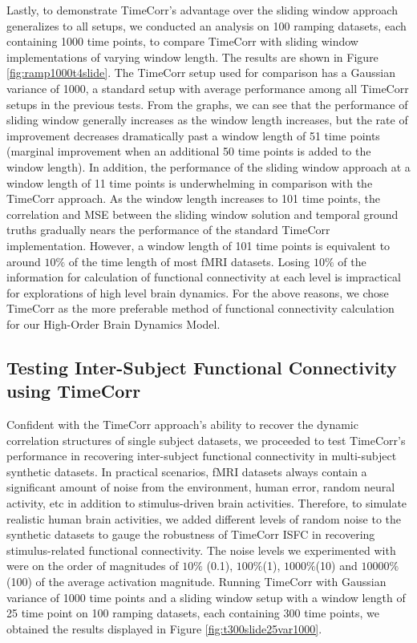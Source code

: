 \documentclass[11pt]{article}
\begin{document}
Lastly, to demonstrate TimeCorr's advantage over the sliding window approach generalizes to all setups, we conducted an analysis on 100 ramping datasets, each containing 1000 time points, to compare TimeCorr with sliding window implementations of varying window length. The results are shown in Figure \ref{fig:ramp1000t4slide}. The TimeCorr setup used for comparison has a Gaussian variance of 1000, a standard setup with average performance among all TimeCorr setups in the previous tests. From the graphs, we can see that the performance of sliding window generally increases as the window length increases, but the rate of improvement decreases dramatically past a window length of 51 time points (marginal improvement when an additional 50 time points is added to the window length). In addition, the performance of the sliding window approach at a window length of 11 time points is underwhelming in comparison with the TimeCorr approach. As the window length increases to 101 time points, the correlation and MSE between the sliding window solution and temporal ground truths gradually nears the performance of the standard TimeCorr implementation. However, a window length of 101 time points is equivalent to around $10\%$ of the time length of most fMRI datasets. Losing $10\%$ of the information for calculation of functional connectivity at each level is impractical for explorations of high level brain dynamics. For the above reasons, we chose TimeCorr as the more preferable method of functional connectivity calculation for our High-Order Brain Dynamics Model.


\subsection{Testing Inter-Subject Functional Connectivity using TimeCorr}
Confident with the TimeCorr approach's ability to recover the dynamic correlation structures of single subject datasets, we proceeded to test TimeCorr's performance in recovering inter-subject functional connectivity in multi-subject synthetic datasets. In practical scenarios, fMRI datasets always contain a significant amount of noise from the environment, human error, random neural activity, etc in addition to stimulus-driven brain activities. Therefore, to simulate realistic human brain activities, we added different levels of random noise to the synthetic datasets to gauge the robustness of TimeCorr ISFC in recovering stimulus-related functional connectivity. The noise levels we experimented with were on the order of magnitudes of $10\%$ (0.1), $100\%$(1), $1000\%$(10) and $10000\%$(100) of the average activation magnitude. Running TimeCorr with Gaussian variance of 1000 time points and a sliding window setup with a window length of 25 time point on 100 ramping datasets, each containing 300 time points, we obtained the results displayed in Figure \ref{fig:t300slide25var1000}.
\end{document}
